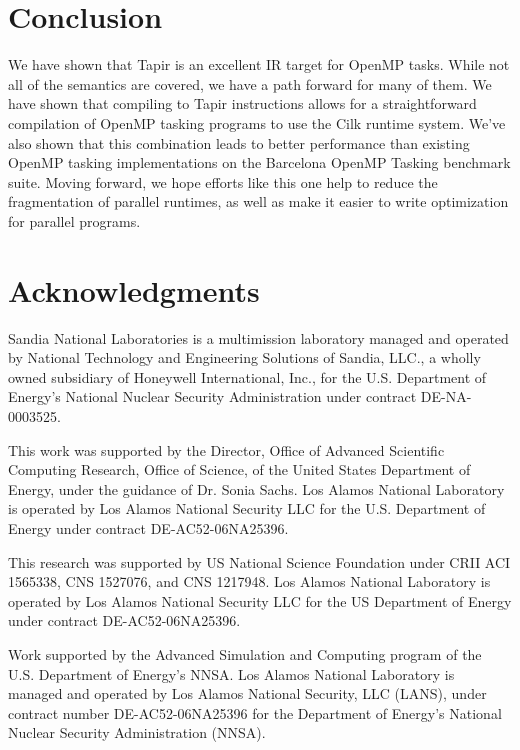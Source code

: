 \documentclass[sigconf]{acmart}
\begin{document}
\section{Conclusion} \label{Sec:Conclusion}
We have shown that Tapir is an excellent IR target for OpenMP tasks. While not
all of the semantics are covered, we have a path forward for many of them. We have
shown that compiling to Tapir instructions allows for a straightforward compilation of 
OpenMP tasking programs to use the Cilk runtime system. We've also shown that this
combination leads to better performance than existing OpenMP tasking implementations
on the Barcelona OpenMP Tasking benchmark suite. Moving forward, we hope efforts like
this one help to reduce the fragmentation of parallel runtimes, as well as make
it easier to write optimization for parallel programs. 

\section*{Acknowledgments}
Sandia National Laboratories is a multimission laboratory managed and operated 
by National Technology and Engineering Solutions of Sandia, LLC., a wholly 
owned subsidiary of Honeywell International, Inc., for the U.S. Department of 
Energy’s National Nuclear Security Administration under contract DE-NA-0003525.


This work was supported by the Director, Office of Advanced Scientific
Computing Research, Office of Science, of the United States Department
of Energy, under the guidance of Dr. Sonia Sachs. Los Alamos National
Laboratory is operated by Los Alamos National Security LLC for the U.S.
Department of Energy under contract DE-AC52-06NA25396.

This research was supported by US National Science Foundation under CRII
ACI 1565338, CNS 1527076, and CNS 1217948. Los Alamos National
Laboratory is operated by Los Alamos National Security LLC for the US
Department of Energy under contract DE-AC52-06NA25396.

Work supported by the Advanced Simulation and Computing program of the
U.S. Department of Energy's NNSA\@.  Los Alamos National Laboratory is
managed and operated by Los Alamos National Security, LLC (LANS), under
contract number DE-AC52-06NA25396 for the Department of Energy’s
National Nuclear Security Administration (NNSA).



\end{document}
